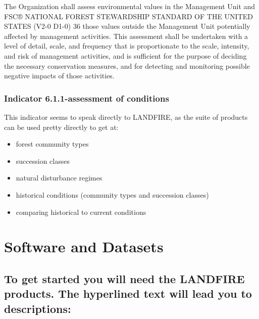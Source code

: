 \documentclass[
]{book}
\providecommand{\tightlist}{%
  \setlength{\itemsep}{0pt}\setlength{\parskip}{0pt}}
\begin{document}
The Organization shall assess environmental values in the Management Unit and
FSC® NATIONAL FOREST STEWARDSHIP STANDARD OF THE UNITED STATES (V2-0 D1-0) 36
those values outside the Management Unit potentially affected by management
activities. This assessment shall be undertaken with a level of detail, scale, and
frequency that is proportionate to the scale, intensity, and risk of management
activities, and is sufficient for the purpose of deciding the necessary conservation
measures, and for detecting and monitoring possible negative impacts of those
activities.

\hypertarget{indicator-6.1.1-assessment-of-conditions}{%
\subsection{Indicator 6.1.1-assessment of conditions}\label{indicator-6.1.1-assessment-of-conditions}}

This indicator seems to speak directly to LANDFIRE, as the suite of products can be used pretty directly to get at:

\begin{itemize}
\tightlist
\item
  forest community types
\item
  succession classes
\item
  natural disturbance regimes
\item
  historical conditions (community types and succession classes)
\item
  comparing historical to current conditions
\end{itemize}

\hypertarget{softAndData}{%
\chapter{Software and Datasets}\label{softAndData}}

\hypertarget{to-get-started-you-will-need-the-landfire-products.-the-hyperlined-text-will-lead-you-to-descriptions}{%
\section{To get started you will need the LANDFIRE products. The hyperlined text will lead you to descriptions:}\label{to-get-started-you-will-need-the-landfire-products.-the-hyperlined-text-will-lead-you-to-descriptions}}
\end{document}
